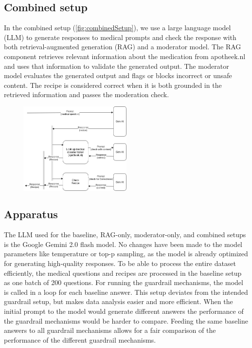 \subsection{Combined setup}

In the combined setup (\autoref{fig:combinedSetup}), we use a large language model (LLM) to generate responses to medical prompts and check the response with both retrieval-augmented generation (RAG) and a moderator model.
The RAG component retrieves relevant information about the medication from apotheek.nl and uses that information to validate the generated output.
The moderator model evaluates the generated output and flags or blocks incorrect or unsafe content.
The recipe is considered correct when it is both grounded in the retrieved information and passes the moderation check.

\begin{figure}[H]
    \includegraphics[width=0.5\textwidth]{figures/combinedSetup.png}
    \label{fig:combinedSetup}
\end{figure}

\subsection{Apparatus}

The LLM used for the baseline, RAG-only, moderator-only, and combined setups is the Google Gemini 2.0 flash model.
No changes have been made to the model parameters like temperature or top-p sampling, as the model is already optimized for generating high-quality responses.
To be able to process the entire dataset efficiently, the medical questions and recipes are processed in the baseline setup as one batch of 200 questions.
For running the guardrail mechanisms, the model is called in a loop for each baseline answer.
This setup deviates from the intended guardrail setup, but makes data analysis easier and more efficient.
When the initial prompt to the model would generate different answers the performance of the guardrail mechanisms would be harder to compare.
Feeding the same baseline answers to all guardrail mechanisms allows for a fair comparison of the performance of the different guardrail mechanisms.

